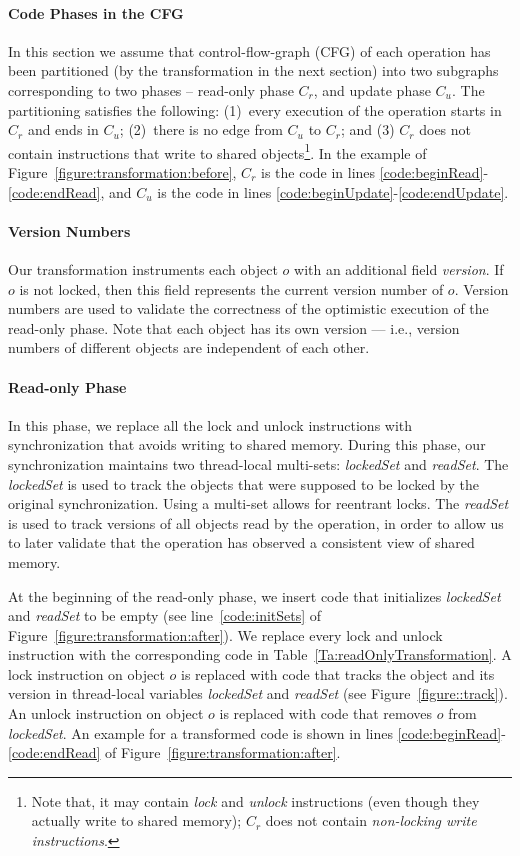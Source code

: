 \paragraph{Code Phases in the CFG}
In this section we assume that
control-flow-graph (CFG) of each operation has been partitioned (by the transformation in the next section)
into two subgraphs corresponding to two phases --
read-only phase $C_r$, and update phase $C_u$. The partitioning satisfies the following:
(1)~every execution of the operation starts in $C_r$ and ends in $C_u$; (2)~there is no edge from $C_u$ to  $C_r$;
and (3) $C_r$ does not contain instructions that write to shared objects\footnote{
Note that, it may contain \emph{lock} and \emph{unlock} instructions (even though they actually write to shared memory);
$C_r$ does not contain \emph{non-locking write instructions}.
}.
%
In the example of Figure~\ref{figure:transformation:before}, $C_r$ is the code in lines \ref{code:beginRead}-\ref{code:endRead},
and $C_u$ is the code in lines \ref{code:beginUpdate}-\ref{code:endUpdate}.

\paragraph{Version Numbers}
Our transformation instruments each object $o$ with an additional field \emph{version}.
If $o$ is not locked, then this field  represents the current version number of $o$.
Version numbers are used to validate the correctness of the optimistic execution of the read-only phase.
Note that each object has its own version --- i.e., version numbers of different objects are independent of each other.

\paragraph{Read-only Phase}
In this phase, we replace all the lock and unlock instructions with synchronization that avoids writing to shared memory.
During this phase, our synchronization maintains two thread-local multi-sets: \emph{lockedSet} and \emph{readSet}.
The \emph{lockedSet} is used to track the objects that were supposed to be locked by the original synchronization.
Using a multi-set allows for reentrant locks.
The \emph{readSet} is used to track versions of all objects read by the
operation, in order to allow us to later validate that the operation has observed a consistent view of shared memory.

At the beginning of the read-only phase, we insert code that initializes \emph{lockedSet} and \emph{readSet} to be empty (see  line~\ref{code:initSets} of Figure~\ref{figure:transformation:after}).
We replace every lock and unlock instruction with the corresponding code in Table~\ref{Ta:readOnlyTransformation}.
A lock instruction on object $o$ is replaced with code that tracks the object and its version in
thread-local variables \emph{lockedSet} and \emph{readSet} (see Figure~\ref{figure::track}).
An unlock instruction on object $o$ is replaced with code that removes $o$ from \emph{lockedSet}.
An example for a transformed code is shown in lines \ref{code:beginRead}-\ref{code:endRead} of Figure~\ref{figure:transformation:after}.

